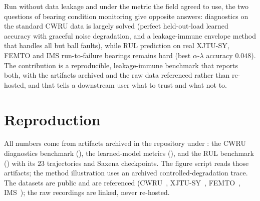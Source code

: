 \documentclass[journal]{IEEEtran}
\begin{document}
Run without data leakage and under the metric the field agreed to use, the two questions of bearing condition
monitoring give opposite answers: diagnostics on the standard CWRU data is largely solved (perfect held-out-load
learned accuracy with graceful noise degradation, and a leakage-immune envelope method that handles all but ball
faults), while RUL prediction on real XJTU-SY, FEMTO and IMS run-to-failure bearings remains hard (best
$\alpha$-$\lambda$ accuracy $0.048$). The contribution is a reproducible, leakage-immune benchmark that reports
both, with the artifacts archived and the raw data referenced rather than re-hosted, and that tells a downstream
user what to trust and what not to.

\appendices
\section{Reproduction}\label{app:repro}

{\raggedright
All numbers come from artifacts archived in the repository under : the CWRU diagnostics
benchmark (), the learned-model metrics (), and the RUL
benchmark () with its $23$ trajectories and Saxena checkpoints. The figure script
reads those artifacts; the method illustration uses an archived controlled-degradation trace. The datasets are
public and are referenced (CWRU~\cite{smith}, XJTU-SY~\cite{wang}, FEMTO~\cite{nectoux}, IMS~\cite{qiu}); the raw
recordings are linked, never re-hosted.\par}

\balance
\end{document}
